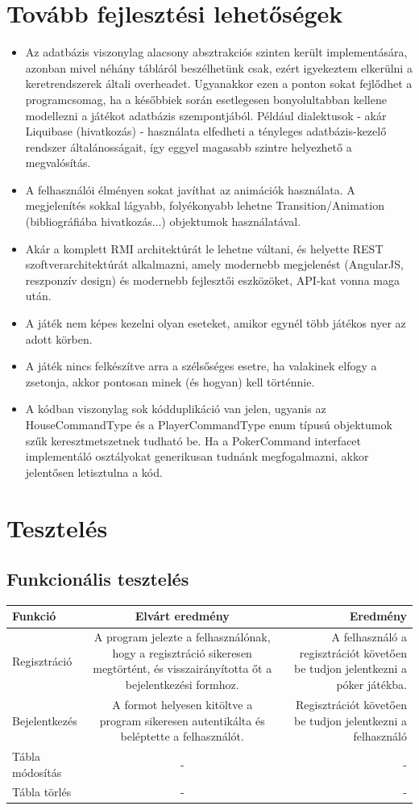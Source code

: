 \section{Tovább fejlesztési lehetőségek}
\begin{itemize}
\item Az adatbázis viszonylag alacsony absztrakciós szinten került implementására, azonban mivel néhány tábláról beszélhetünk csak, ezért igyekeztem elkerülni a keretrendszerek általi overheadet. Ugyanakkor ezen a ponton sokat fejlődhet a programcsomag, ha a későbbiek során esetlegesen bonyolultabban kellene modellezni a játékot adatbázis szempontjából. Például dialektusok - akár Liquibase (hivatkozás) - használata elfedheti a tényleges adatbázis-kezelő rendszer általánosságait, így eggyel magasabb szintre helyezhető a megvalósítás.
\item A felhasználói élményen sokat javíthat az animációk használata. A megjelenítés sokkal lágyabb, folyékonyabb lehetne Transition/Animation (bibliográfiába hivatkozás...) objektumok használatával.
\item Akár a komplett RMI architektúrát le lehetne váltani, és helyette REST szoftverarchitektúrát alkalmazni, amely modernebb megjelenést (AngularJS, reszponzív design) és modernebb fejlesztői eszközöket, API-kat vonna maga után.
\item A játék nem képes kezelni olyan eseteket, amikor egynél több játékos nyer az adott körben.
\item A játék nincs felkészítve arra a szélsőséges esetre, ha valakinek elfogy a zsetonja, akkor pontosan minek (és hogyan) kell történnie.
\item A kódban viszonylag sok kódduplikáció van jelen, ugyanis az HouseCommandType és a PlayerCommandType enum típusú objektumok szűk keresztmetszetnek tudható be. Ha a PokerCommand interfacet implementáló osztályokat generikusan tudnánk megfogalmazni, akkor jelentősen letisztulna a kód.
\end{itemize}

\section{Tesztelés}
\subsection{Funkcionális tesztelés}
\begin{tabular}{| l | c | r |}
\hline
  Funkció & Elvárt eredmény & Eredmény \\ \hline
  Regisztráció & A program jelezte a felhasználónak, hogy a regisztráció sikeresen megtörtént, és visszairányította őt a bejelentkezési formhoz. & A felhasználó a regisztrációt követően be tudjon jelentkezni a póker játékba. \\ \hline
  Bejelentkezés & A formot helyesen kitöltve a program sikeresen autentikálta és beléptette a felhasználót. & Regisztrációt követően be tudjon jelentkezni a felhasználó \\ \hline
  Tábla módosítás & - & - \\ \hline
  Tábla törlés & - & - \\ \hline
\end{tabular}

\clearpage
